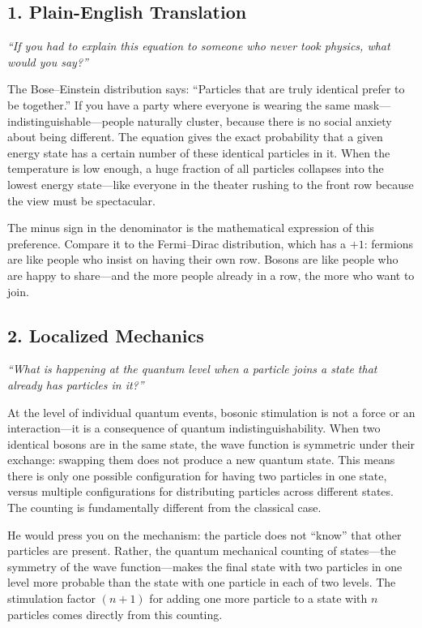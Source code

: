 \subsection*{1. Plain-English Translation}
\textit{``If you had to explain this equation to someone who never took physics, what would you say?''}

The Bose--Einstein distribution says: ``Particles that are truly identical prefer to be together.'' If you have a party where everyone is wearing the same mask---indistinguishable---people naturally cluster, because there is no social anxiety about being different. The equation gives the exact probability that a given energy state has a certain number of these identical particles in it. When the temperature is low enough, a huge fraction of all particles collapses into the lowest energy state---like everyone in the theater rushing to the front row because the view must be spectacular.

The minus sign in the denominator is the mathematical expression of this preference. Compare it to the Fermi--Dirac distribution, which has a $+1$: fermions are like people who insist on having their own row. Bosons are like people who are happy to share---and the more people already in a row, the more who want to join.

\subsection*{2. Localized Mechanics}
\textit{``What is happening at the quantum level when a particle joins a state that already has particles in it?''}

At the level of individual quantum events, bosonic stimulation is not a force or an interaction---it is a consequence of quantum indistinguishability. When two identical bosons are in the same state, the wave function is symmetric under their exchange: swapping them does not produce a new quantum state. This means there is only one possible configuration for having two particles in one state, versus multiple configurations for distributing particles across different states. The counting is fundamentally different from the classical case.

He would press you on the mechanism: the particle does not ``know'' that other particles are present. Rather, the quantum mechanical counting of states---the symmetry of the wave function---makes the final state with two particles in one level more probable than the state with one particle in each of two levels. The stimulation factor $(n+1)$ for adding one more particle to a state with $n$ particles comes directly from this counting.

